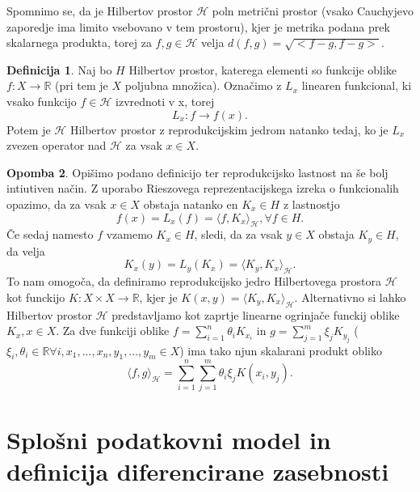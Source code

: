 \documentclass[12pt,a4paper]{amsart}
\theoremstyle{definition} %
\newtheorem{definicija}{Definicija}[section]
\newtheorem{opomba}[definicija]{Opomba}
\theoremstyle{plain} %
\begin{document}
Spomnimo se, da je Hilbertov prostor $\mathcal{H}$ poln metrični prostor (vsako Cauchyjevo zaporedje ima limito vsebovano v tem prostoru), kjer je metrika podana prek skalarnega produkta, torej za $f,g \in \mathcal{H}$ velja $d(f,g) = \sqrt{<f-g,f-g>}$.
\begin{definicija}
Naj bo $H$ Hilbertov prostor, katerega elementi so funkcije oblike $f: X \rightarrow \mathbb{R}$ (pri tem je $X$ poljubna množica). Označimo z $L_x$ linearen funkcional, ki vsako funkcijo $f \in \mathcal{H}$ izvrednoti v x, torej $$L_x : f \rightarrow f(x).$$ Potem je $\mathcal{H}$ Hilbertov prostor z reprodukcijskim jedrom natanko tedaj, ko je $L_x$ zvezen operator nad $\mathcal{H}$ za vsak $x \in X$. 
\end{definicija}
\begin{opomba}
Opišimo podano definicijo ter reprodukcijsko lastnost na še bolj intiutiven način. Z uporabo Rieszovega reprezentacijskega izreka o funkcionalih opazimo, da za vsak $x \in X$ obstaja natanko en $K_x \in H$ z lastnostjo
$$
f(x) = L_x(f) = \langle f, K_x \rangle_{\mathcal{H}}, \forall f \in H.
$$
Če sedaj namesto $f$ vzamemo $K_x \in H$, sledi, da za vsak $y \in X$ obstaja $K_y \in H$, da velja
$$
K_x(y) = L_y(K_x) = \langle K_y, K_x \rangle_{\mathcal{H}}.
$$
To nam omogoča, da definiramo reprodukcijsko jedro Hilbertovega prostora $\mathcal{H}$ kot funckijo $K: X \times X \rightarrow \mathbb{R}$, kjer je $K(x,y)=\langle K_y, K_x \rangle_{\mathcal{H}}.$
\newline
\newline
Alternativno si lahko Hilbertov prostor $\mathcal{H}$ predstavljamo kot zaprtje linearne ogrinjače funckij oblike $K_x, x \in X$. Za dve funkciji oblike $f = \sum_{i=1}^{n}\theta_i K_{x_i}$ in $ g = \sum_{j=1}^{m}\xi_j K_{y_j}$ ($\xi_i, \theta_i \in \mathbb{R} \forall i, x_1,...,x_n,y_1,...,y_m \in X$) ima tako njun skalarani produkt obliko
$$
\langle f, g\rangle_{\mathcal{H}} = \sum_{i=1}^{n}\sum_{j=1}^{m}\theta_i \xi_j K(x_i,y_j).
$$

\end{opomba}

\section{Splošni podatkovni model in definicija diferencirane zasebnosti}
\end{document}
